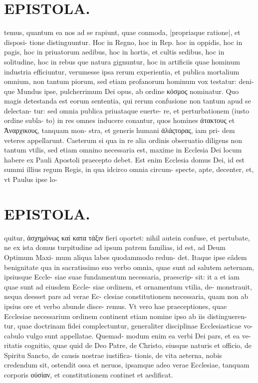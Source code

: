 \documentclass{article}
\begin{document}
\begin{pages}
\section*{EPISTOLA. }temus, quantum ea nos ad se rapiunt, quae conmoda, |propriaque ratione|, et disposi- tione distinguuntur. Hoc in Regno, hoc in Rep. hoc in oppidis, hoc in pagis, hoc in priuatorum aedibus, hoc in hortis, et cultis sedibus, hoc in solitudine, hoc in rebus que natura gignuntur, hoc in artificiis quae hominum industria efficiuntur, verumesse ipsa rerum experientia, et publica mortalium omnium, non tantum piorum, sed etiam profanorum hominum vox testatur: deni- que Mundus ipse, pulcherrimum Dei opus, ab ordine κόσμος nominatur. Quo magis detestanda est eorum sententia, qui rerum confusione non tantum apud se delectan- tur: sed omnia publica priuataque euerte- re, et perturbationem (iusto ordine subla- to) in res omnes inducere conantur, quos homines ἀτακτους et Ἀναρχικους, tanquam mon- stra, et generis humani ἀλάςτορας, iam pri- dem veteres appellarunt. Caeterum si qua in re alia ordinis obseruatio diligens non tantum vtilis, sed etiam omnino necessaria est, maxime in Ecclesia Dei locum habere ex Pauli Apostoli praecepto debet. Est enim Ecclesia domus Dei, id est summi illius regum Regis, in qua idcirco omnia circum- specte, apte, decenter, et, vt Paulus ipse lo- 
\section*{EPISTOLA. }quitur, ἀσχημόνως καί κατα τάξιν fieri oportet: nihil autein confuse, et pertubate, ne ex ista domus turpitudine ad ipsum patrem familias, id est, ad Deum Optimum Maxi- mum aliqua labes quodammodo redun- det. Itaque ipse eâdem benignitate qua in sacratissimo suo verbo omnia, quae sunt ad salutem aeternam, ipsiusque Eccle- siae suae fundamentum necessaria, praescrip- sit: it a et iam quae sunt ad eiusdem Eccle- siae ordinem, et ornamentum vtilia, de- monstrauit, nequa deesset pars ad verae Ec- clesiae constitutionem necessaria, quam non ab ipsius ore et verbo abunde disce- remus. Vt vero hae praeceptiones, quae Ecclesiae necessarium ordinem continent etiam nomine ipso ab iis distingueren- tur, quae doctrinam fidei complectuntur, generaliter disciplinae Ecclesiasticae vo- cabulo vulgo sunt appellatae. Quemad- modum enim ea verbi Dei pars, et ea ve- ritatis cognitio, quae quid de Deo Patre, de Christo, eiusque naturis et officio, de Spiritu Sancto, de causis nostrae iustifica- tionis, de vita aeterna, nobis credendum sit, ostendit ossa et neruos, ipsamque adeo verae Ecclesiae, tanquam corporis οὐσίαν, et constitutionem continet et aedificat. 

\end{pages}
\end{document}
